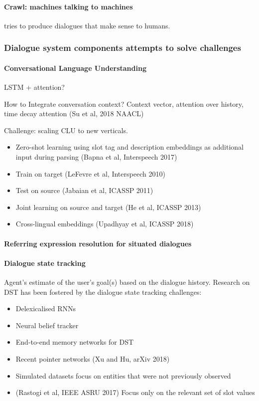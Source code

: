 \paragraph{Crawl: machines talking to machines} \cite{Shah2018Bootstrapping} tries to produce dialogues that make sense to humans. 


\subsubsection{Dialogue system components attempts to solve challenges}

\paragraph{Conversational Language Understanding}
LSTM + attention?

How to Integrate conversation context?
Context vector, attention over history, time decay attention (Su et al, 2018 NAACL)

Challenge: scaling CLU to new verticals.
\begin{itemize}
	\item Zero-shot learning using slot tag and description embeddings as additional input during parsing (Bapna et al, Interspeech 2017)
	\item Train on target (LeFevre et al, Interspeech 2010)
	\item Test on source (Jabaian et al, ICASSP 2011)
	\item Joint learning on source and target (He et al, ICASSP 2013)
	\item Cross-lingual embeddings (Upadhyay et al, ICASSP 2018)
\end{itemize}

\paragraph{Referring expression resolution for situated dialogues}


\paragraph{Dialogue state tracking}
Agent's estimate of the user's goal(s) based on the dialogue history. Research on DST has been fostered by the dialogue state tracking challenges:
\begin{itemize}
	\item Delexicalised RNNs 
	\item Neural belief tracker 
	\item End-to-end memory networks for DST
	\item Recent pointer networks (Xu and Hu, arXiv 2018)
	\item Simulated datasets focus on entities that were not previously observed
	\item (Rastogi et al, IEEE ASRU 2017) Focus only on the relevant set of slot values
\end{itemize}

